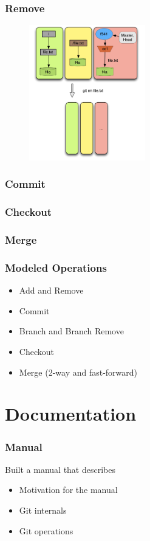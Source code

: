 \documentclass{beamer}
\begin{document}
\begin{frame}[fragile]
   \frametitle{Remove}
   \begin{figure}
      \centering
      \includegraphics[width=0.45\textwidth]{images/remove1.png}
   \end{figure}
\end{frame}

\begin{frame}
	\frametitle{Commit}
\end{frame}

\begin{frame}
	\frametitle{Checkout}
\end{frame}

\begin{frame}
	\frametitle{Merge}
\end{frame}

\begin{frame}[fragile]
   \frametitle{Modeled Operations}
   \begin{itemize}
      \item Add and Remove
      \item Commit
      \item Branch and Branch Remove
      \item Checkout
      \item Merge (2-way and fast-forward)
   \end{itemize}
\end{frame}

\section{Documentation}

\begin{frame}
	\frametitle{Manual}
	\begin{block}{Built a manual that describes}
	\begin{itemize}
		\item Motivation for the manual
		\item Git internals
		\item Git operations
	\end{itemize}
	\end{block}
\end{frame}
\end{document}
